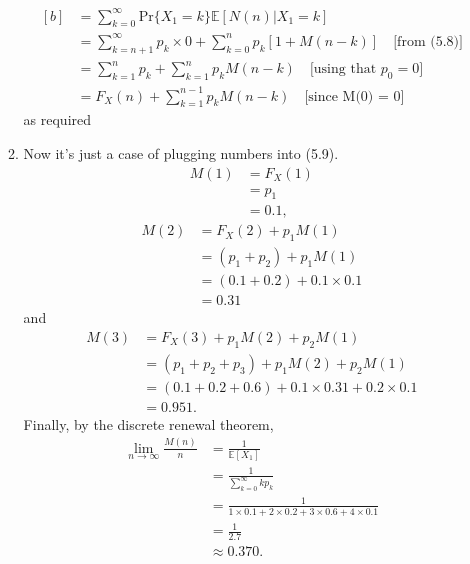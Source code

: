 \documentclass[11pt,a4paper]{article}
\begin{document}
\begin{enumerate}
\begin{enumerate}
\begin{equation}
\begin{aligned}[b]
          &= \sum_{k = 0}^\infty\text{Pr}\{X_1 = k\}\mathbb{E}[N(n) | X_1 = k]\\
          &= \sum_{k = n + 1}^\infty p_k\times 0 + \sum_{k = 0}^n p_k[1 + M(n - k)]\quad \text{[from (5.8)]}\\
          &= \sum_{k = 1}^n p_k + \sum_{k = 1}^np_kM(n - k)\quad \text{[using that $p_0 = 0$]}\\
          &= F_X(n) + \sum_{k = 1}^{n - 1}p_kM(n - k)\quad \text{[since M(0) = 0]}
        \end{aligned}
      \end{equation}
      as required
      \item Now it's just a case of plugging numbers into (5.9).
      \begin{align*}
        M(1)
        &= F_X(1)\\
        &= p_1\\
        &= 0.1,
      \end{align*}
      \begin{align*}
        M(2)
        &= F_X(2) + p_1M(1)\\
        &= (p_1 + p_2) + p_1M(1)\\
        &= (0.1 + 0.2) + 0.1\times 0.1\\
        &= 0.31
      \end{align*}
      and
      \begin{align*}
        M(3)
        &= F_X(3) + p_1M(2) + p_2M(1)\\
        &= (p_1 + p_2 + p_3) + p_1M(2) + p_2M(1)\\
        &= (0.1 + 0.2 + 0.6) + 0.1\times 0.31 + 0.2\times 0.1\\
        &= 0.951.
      \end{align*}
      Finally, by the discrete renewal theorem,
      \begin{align*}
        \lim_{n\to \infty}\frac{M(n)}{n}
        &= \frac{1}{\mathbb{E}[X_1]}\\
        &= \frac{1}{\sum_{k = 0}^\infty kp_k}\\
        &= \frac{1}{1\times 0.1 + 2\times 0.2 + 3\times 0.6 + 4\times 0.1}\\
        &= \frac{1}{2.7}\\
        &\approx 0.370.
      \end{align*}
    \end{enumerate}
  \end{enumerate}
\end{document}

